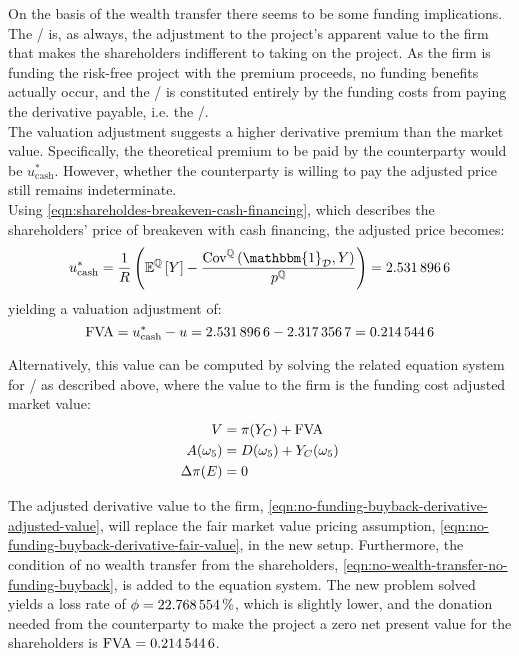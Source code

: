 \documentclass[main.tex]{subfiles}
\begin{document}
            On the basis of the wealth transfer there seems to be some funding implications.
            The \FVA/ is, as always, the adjustment to the project's apparent value to the firm that makes the shareholders indifferent to taking on the project.
            As the firm is funding the risk-free project with the premium proceeds, no funding benefits actually occur, and the \FVA/ is constituted entirely by the funding costs from paying the derivative payable, i.e. the \FCA/.
            \\
            The valuation adjustment suggests a higher derivative premium than the market value.
            Specifically, the theoretical premium to be paid by the counterparty would be $u_{\text{cash}}^{\ast}$.
            However, whether the counterparty is willing to pay the adjusted price still remains indeterminate.
            \\
            Using \cref{eqn:shareholdes-breakeven-cash-financing}, which describes the shareholders' price of breakeven with cash financing, the adjusted price becomes:
            \begin{equation}
                u_{\text{cash}}^{\ast} = \discountfactor \left(
                    \mathbb{E}^{\rnmeasure}\left[Y\right] -
                    \frac{\text{Cov}^{\rnmeasure}\left(\mathbbm{1}_{\mathcal{D}},Y\right)}
                    {p^{\rnmeasure}}
                \right)
                = \num{2.5318966}
            \end{equation}
            yielding a valuation adjustment of:
            \begin{equation}
                \FVA/ = u_{\text{cash}}^{\ast} - u = \num{2.5318966} - \num{2.3173567} = \num{0.2145446}
            \end{equation}

            Alternatively, this value can be computed by solving the related equation system for \FCA/ as described above, where the value to the firm is the funding  cost adjusted market value:
            \begin{align}
                V &= \pi(Y_C) + \FVA/
                \label{eqn:no-funding-buyback-derivative-adjusted-value}
                \\
                A(\omega_5) &= D(\omega_5) + Y_C(\omega_5)
                \\
                \Delta \pi(E) &= 0
                \label{eqn:no-wealth-transfer-no-funding-buyback}
            \end{align}

            The adjusted derivative value to the firm, \cref{eqn:no-funding-buyback-derivative-adjusted-value},
            will replace the fair market value pricing assumption, \cref{eqn:no-funding-buyback-derivative-fair-value}, in the new setup.
            Furthermore, the condition of no wealth transfer from the shareholders, \cref{eqn:no-wealth-transfer-no-funding-buyback}, is added to the equation system.
            The new problem solved yields a loss rate of $\phi = \pct{0.22768554}$,
            which is slightly lower,
            and the donation needed from the counterparty to make the project a zero net present value for the shareholders is $\FVA/ = \num{0.2145446}$.
\end{document}
